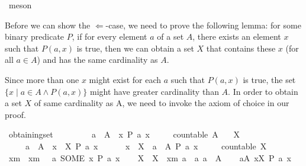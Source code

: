 \begin{isabellebody}
\ meson\isanewline
{}\isamarkupfalse%
%
\endisatagvisible
{\isafoldvisible}%
%
\isadelimvisible
%
\endisadelimvisible
%
\begin{isamarkuptext}%
\pagebreak
Before we can show the $\Longleftarrow$-case, we need to prove the following lemma: for some binary predicate $P$, if for every element $a$ of a set $A$, there exists an element $x$ such that $P(a,x)$ is true, then we can obtain a set $X$ that contains these $x$ (for all $a \in A$) and has the same cardinality as $A$. 

Since more than one $x$ might exist for each $a$ such that $P(a,x)$ is true, the set
$\{ x \mid a \in A \wedge P(a,x) \}$
might have greater cardinality than $A$. In order to obtain a set $X$ of same cardinality as A, we need to invoke the axiom of choice in our proof.%
\end{isamarkuptext}\isamarkuptrue%
%
\isadelimvisible
%
\endisadelimvisible
%
\isatagvisible
{}\isamarkupfalse%
\ obtaining{\isacharunderscore}{\kern0pt}set{\isacharcolon}{\kern0pt}\isanewline
\ \ \ \isanewline
\ \ \ \ {\isacartoucheopen}{\isasymforall}\ a\ {\isasymin}\ A{\isachardot}{\kern0pt}\ {\isasymexists}\ x{\isachardot}{\kern0pt}\ P\ a\ x{\isacartoucheclose}\ \isanewline
\ \ \ \ {\isacartoucheopen}countable\ A{\isacartoucheclose}\isanewline
\ \ \ X\ \ \isanewline
\ \ \ \ {\isacartoucheopen}{\isasymforall}\ a\ {\isasymin}\ A{\isachardot}{\kern0pt}\ {\isasymexists}\ x\ {\isasymin}\ X{\isachardot}{\kern0pt}\ P\ a\ x{\isacartoucheclose}\ \isanewline
\ \ \ \ {\isacartoucheopen}{\isasymforall}\ x\ {\isasymin}\ X{\isachardot}{\kern0pt}\ {\isasymexists}\ a\ {\isasymin}\ A{\isachardot}{\kern0pt}\ P\ a\ x{\isacartoucheclose}\ \isanewline
\ \ \ \ {\isacartoucheopen}countable\ X{\isacartoucheclose}\isanewline
{}\isamarkupfalse%
\isanewline
\ \ %
\isanewline
\ \ \isamarkupfalse%
\ xm\ \ {\isacartoucheopen}xm\ {\isasymequiv}\ {\isasymlambda}\ a{\isachardot}{\kern0pt}\ SOME\ x{\isachardot}{\kern0pt}\ P\ a\ x{\isacartoucheclose}\isanewline
\ \ \isamarkupfalse%
\ X\ \ {\isacartoucheopen}X\ {\isasymequiv}\ {\isacharbraceleft}{\kern0pt}xm\ a\ {\isacharbar}{\kern0pt}\ a{\isachardot}{\kern0pt}\ a\ {\isasymin}\ A{\isacharbraceright}{\kern0pt}{\isacartoucheclose}\isanewline
\isanewline
\ \ \isamarkupfalse%
\ {\isacartoucheopen}{\isasymforall}a{\isasymin}A{\isachardot}{\kern0pt}\ {\isasymexists}x{\isasymin}X{\isachardot}{\kern0pt}\ P\ a\ x{\isacartoucheclose}\isanewline

\end{isabellebody}

